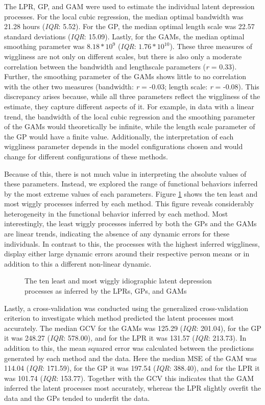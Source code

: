 \documentclass[man, floatsintext]{apa7}
\begin{document}
The LPR, GP, and GAM were used to estimate the individual latent depression
processes. For the local cubic regression, the median optimal bandwidth was
21.28 hours (\textit{IQR}: 5.52). For the GP, the median optimal length scale
was 22.57 standard deviations (\textit{IQR}: 15.09). Lastly, for the GAMs, the
median optimal smoothing parameter was $8.18*10^9$ (\textit{IQR}:
$1.76*10^{10}$). These three measures of wiggliness are not only on different
scales, but there is also only a moderate correlation between the bandwidth and
lengthscale parameters (\textit{r} = 0.33). Further, the smoothing parameter of
the GAMs shows little to no correlation with the other two measures (bandwidth:
\textit{r} = -0.03; length scale: \textit{r} = -0.08). This discrepancy arises
because, while all three parameters reflect the wiggliness of the estimate,
they capture different aspects of it. For example, in data with a linear trend,
the bandwidth of the local cubic regression and the smoothing parameter of the
GAMs would theoretically be infinite, while the length scale parameter of the
GP would have a finite value. Additionally, the interpretation of each
wiggliness parameter depends in the model configurations chosen and would
change for different configurations of these methods.

Because of this, there is not much value in interpreting the absolute values of
these parameters. Instead, we explored the range of functional behaviors
inferred by the most extreme values of each parameters. Figure
\ref{fig:dem_smooth} shows the ten least and most wiggly processes inferred by
each method. This figure reveals considerably heterogeneity in the functional
behavior inferred by each method. Most interestingly, the least wiggly
processes inferred by both the GPs and the GAMs are linear trends, indicating
the absence of any dynamic errors for these individuals. In contrast to this,
the processes with the highest inferred wiggliness, display either large
dynamic errors around their respective person means or in addition to this a
different non-linear dynamic.

\begin{figure}[!t]
  \caption{The ten least and most wiggly idiographic latent depression
    processes as inferred by the LPRs, GPs, and GAMs}
  \label{fig:dem_smooth}
\end{figure}

Lastly, a cross-validation was conducted using the generalized cross-validation
criterion to investigate which method predicted the latent processes most
accurately. The median GCV for the GAMs was 125.29 (\textit{IQR}: 201.04), for
the GP it was 248.27 (\textit{IQR}: 578.00), and for the LPR it was 131.57
(\textit{IQR}: 213.73). In addition to this, the mean squared error was
calculated between the predictions generated by each method and the data. Here
the median MSE of the GAM was 114.04 (\textit{IQR}: 171.59), for the GP it was
197.54 (\textit{IQR}: 388.40), and for the LPR it was 101.74 (\textit{IQR}:
153.77). Together with the GCV this indicates that the GAM inferred the latent
processes most accurately, whereas the LPR slightly overfit the data and the
GPs tended to underfit the data.
\end{document}
